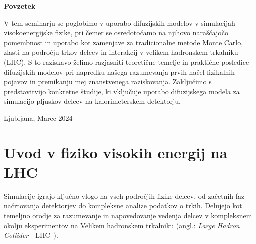 \documentclass[12pt, a4paper]{article}
\begin{document}
\vspace{10mm}
\begin{center}
    \textbf{Povzetek}\\[2mm]
    \begin{minipage}[t]{0.85\textwidth}
        V tem seminarju se poglobimo v uporabo difuzijskih modelov v simulacijah visokoenergijske fizike, pri čemer se osredotočamo na njihovo naraščajočo pomembnost in uporabo kot zamenjave za tradicionalne metode Monte Carlo, zlasti na področju trkov delcev in interakcij v velikem hadronskem trkalniku (LHC). S to raziskavo želimo razjasniti teoretične temelje in praktične posledice difuzijskih modelov pri napredku našega razumevanja prvih načel fizikalnih pojavov in premikanju mej znanstvenega raziskovanja. 
        Zaključimo s predstavitvijo konkretne študije, ki vključuje uporabo difuzijskega modela za simulacijo pljuskov delcev na kalorimeterskem detektorju.

    \end{minipage}

    \vspace{10mm}
    \large{Ljubljana, Marec 2024}
\end{center}

\newpage
\thispagestyle{empty}
\tableofcontents

\newpage


%




\setcounter{page}{1}

\section{Uvod v fiziko visokih energij na LHC}

Simulacije igrajo ključno vlogo na vseh področjih fizike delcev, od začetnih faz načrtovanja detektorjev do kompleksne analize podatkov o trkih. Delujejo kot temeljno orodje za razumevanje in napovedovanje vedenja delcev v kompleksnem okolju eksperimentov na Velikem hadronskem trkalniku (angl.: \textit{Large Hadron Collider} - LHC~\cite{lhc}).
\end{document}
